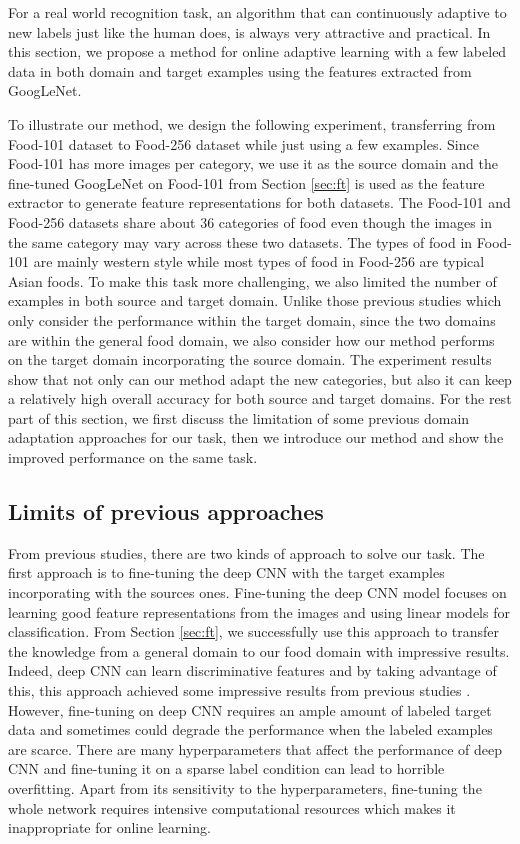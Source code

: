 ﻿For a real world recognition task, an algorithm that can continuously adaptive to new labels just like the human does, is always very attractive and practical.
In this section, we propose a method for online adaptive learning with a few labeled data in both domain and target examples using the features extracted from GoogLeNet.

 To illustrate our method, we design the following experiment, transferring from Food-101 dataset to Food-256 dataset while just using a few examples. Since Food-101 has more images per category, we use it as the source domain and the fine-tuned GoogLeNet on Food-101 from Section \ref{sec:ft} is used as the feature extractor to generate feature representations for both datasets. The Food-101 and Food-256 datasets share about 36 categories of food even though the images in the same category may vary across these two datasets. The types of food in Food-101 are mainly western style while most types of food in Food-256 are typical Asian foods. To make this task more challenging, we also limited the number of examples in both source and target domain. Unlike those previous studies which only consider the performance within the target domain, since the two domains are within the general food domain, we also consider how our method performs on the target domain incorporating the source domain. The experiment results show that not only can our method adapt the new categories, but also it can keep a relatively high overall accuracy for both source and target domains.
For the rest part of this section, we first discuss the limitation of some previous domain adaptation approaches for our task, then we introduce our method and show the improved performance on the same task.
\subsection{Limits of previous approaches}
From previous studies, there are two kinds of approach to solve our task. The first approach is to fine-tuning the deep CNN with the target examples incorporating with the sources ones.
Fine-tuning the deep CNN model focuses on learning good feature representations from the images and using linear models for classification. From Section \ref{sec:ft}, we successfully use this approach to transfer the knowledge from a general domain to our food domain with impressive results. Indeed, deep CNN can learn discriminative features and by taking advantage of this, this approach achieved some impressive results from previous studies\cite{Chatfield14} \cite{zeiler2014visualizing}. However, fine-tuning on deep CNN requires an ample amount of labeled target data and sometimes could degrade the performance when the labeled examples are scarce\cite{hoffman2013one}. There are many hyperparameters that affect the performance of deep CNN and fine-tuning it on a sparse label condition can lead to horrible overfitting. Apart from its sensitivity to the hyperparameters, fine-tuning the whole network requires intensive computational resources which makes it inappropriate for online learning.

